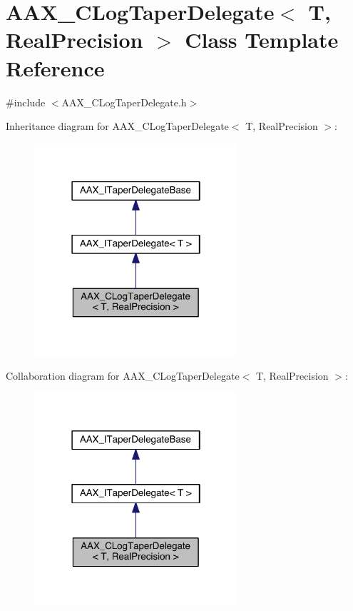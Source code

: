 \hypertarget{a00023}{}\section{A\+A\+X\+\_\+\+C\+Log\+Taper\+Delegate$<$ T, Real\+Precision $>$ Class Template Reference}
\label{a00023}


{\ttfamily \#include $<$A\+A\+X\+\_\+\+C\+Log\+Taper\+Delegate.\+h$>$}



Inheritance diagram for A\+A\+X\+\_\+\+C\+Log\+Taper\+Delegate$<$ T, Real\+Precision $>$\+:
\nopagebreak
\begin{figure}[H]
\begin{center}
\leavevmode
\includegraphics[width=214pt]{a00428}
\end{center}
\end{figure}


Collaboration diagram for A\+A\+X\+\_\+\+C\+Log\+Taper\+Delegate$<$ T, Real\+Precision $>$\+:
\nopagebreak
\begin{figure}[H]
\begin{center}
\leavevmode
\includegraphics[width=214pt]{a00429}
\end{center}
\end{figure}



